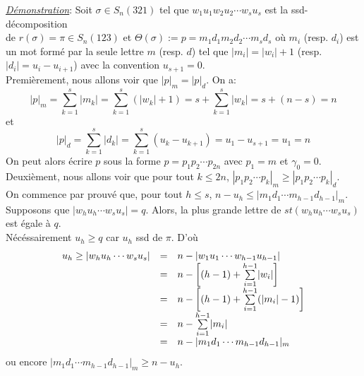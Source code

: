 \underline{\textit{Démonstration}}:
Soit $\sigma\in S_{n}(321)$ tel que $w_{1}u_{1}w_{2}u_2 \cdots w_{s}u_{s}$ est la ssd-décomposition \\ de $r(\sigma)=\pi \in S_{n}(123)$  et $\Theta(\sigma):=p=m_{1}d_{1}m_{2}d_{2}\cdots m_{s}d_{s}$ où  $m_{i}$ (resp. $d_{i}$) est un mot formé par la seule lettre $m$ (resp. $d$) tel que $|m_{i}| = |w_{i}|+1$ (resp. $|d_{i}| = u_{i}-u_{i+1}$) avec la convention $u_{s+1}=0$.\vspace{10pt}\\
Premièrement, nous allons voir que $|p|_{m} = |p|_{d}$. On a:
$$
	|p|_{m} = \underset{k=1}{\overset{s}{\sum}}|m_{k}| = \underset{k=1}{\overset{s}{\sum}}(|w_{k}|+1)=s+\underset{k=1}{\overset{s}{\sum}}|w_{k}| = s+(n-s)=n
$$
et
$$
	|p|_{d} = \underset{k=1}{\overset{s}{\sum}}|d_{k}| = \underset{k=1}{\overset{s}{\sum}}(u_{k}-u_{k+1}) = u_{1} - u_{s+1}=u_{1}=n
$$
On peut alors écrire $p$ sous la forme $p=p_{1}p_{2}\cdots p_{2n}$ avec $p_{1}=m$ et  $\gamma_{0}=0$.\vspace{10pt}\\
Deuxièment, nous allons voir que pour tout $k\leq 2n$, $|p_{1}p_{2}\cdots p_{k}|_{m}\geq |p_{1}p_{2}\cdots p_{k}|_{d}$.\\
On commence par prouvé que, pour tout $h\leq s$, $n-u_{h}\leq |m_{1}d_{1}\cdots m_{h-1}d_{h-1} |_{m}$.\\
Supposons que $| w_{h}u_{h}\cdots w_{s}u_{s} |=q$. Alors, la plus grande lettre de $st(w_{h}u_{h}\cdots w_{s}u_{s})$  est égale à $q$.\\ Nécéssairement $u_{h}\geq q$ car $u_{h}$ ssd de $\pi$. D'où
\[\begin{array}{l l l}
		u_{h}\geq | w_{h}u_{h}\cdots w_{s}u_{s} | & = & n-| w_{1}u_{1}\cdots w_{h-1}u_{h-1} |                                 \\
		                                          & = & n-\left[ (h-1)+ \underset{i=1}{\overset{h-1}{\sum}}|w_{i}|\right]     \\
		                                          & = & n-\left[ (h-1)+ \underset{i=1}{\overset{h-1}{\sum}}(|m_{i}|-1)\right] \\
		                                          & = & n- \underset{i=1}{\overset{h-1}{\sum}}|m_{i}|                         \\
		                                          & = & n - | m_{1}d_{1}\cdots m_{h-1}d_{h-1} |_{m}
	\end{array}
\]
ou encore $| m_{1}d_{1}\cdots m_{h-1}d_{h-1} |_{m}\geq n-u_{h}$.\\

